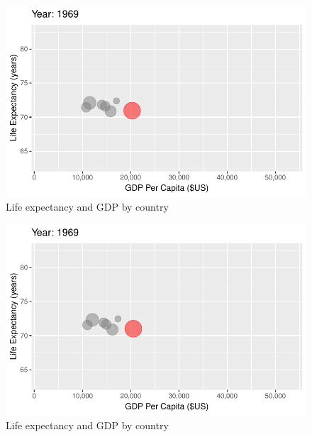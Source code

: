 \documentclass[
  letterpaper,
  DIV=11,
  numbers=noendperiod]{scrreport}
\theoremstyle{definition}
\theoremstyle{remark}
\begin{document}
\begin{figure}

{\centering \includegraphics{index_files/figure-pdf/fig-anim-country-31.pdf}

}

\caption{\label{fig-anim-country-31}Life expectancy and GDP by country}

\end{figure}

\begin{figure}

{\centering \includegraphics{index_files/figure-pdf/fig-anim-country-32.pdf}

}

\caption{\label{fig-anim-country-32}Life expectancy and GDP by country}

\end{figure}
\end{document}
